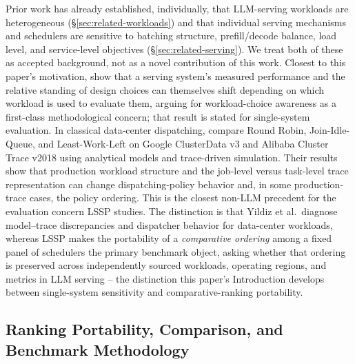 Prior work has already established, individually, that LLM-serving
workloads are heterogeneous (\S\ref{sec:related-workloads}) and that
individual serving mechanisms and schedulers are sensitive to batching
structure, prefill/decode balance, load level, and service-level
objectives (\S\ref{sec:related-serving}). We treat both of these as accepted
background, not as a novel contribution of this work. Closest to this
paper's motivation, \citet{papaioannou2024workload} show that a serving
system's measured performance and the relative standing of design choices
can themselves shift depending on which workload is used to evaluate them,
arguing for workload-choice awareness as a first-class methodological
concern; that result is stated for single-system evaluation. In classical
data-center dispatching, \citet{yildiz2026dispatching} compare Round Robin,
Join-Idle-Queue, and Least-Work-Left on Google ClusterData v3 and Alibaba
Cluster Trace v2018 using analytical models and trace-driven simulation.
Their results show that production workload structure and the job-level
versus task-level trace representation can change dispatching-policy
behavior and, in some production-trace cases, the policy ordering. This is
the closest non-LLM precedent for the evaluation concern LSSP studies. The
distinction is that Yildiz et al.\ diagnose model--trace discrepancies and
dispatcher behavior for data-center workloads, whereas LSSP makes the
portability of a \emph{comparative ordering} among a fixed panel of
schedulers the primary benchmark object, asking whether that ordering is
preserved across independently sourced workloads, operating regions, and
metrics in LLM serving -- the distinction this paper's Introduction
develops between single-system sensitivity and comparative-ranking
portability.

\subsection{Ranking Portability, Comparison, and Benchmark Methodology}
\label{sec:related-methodology}

